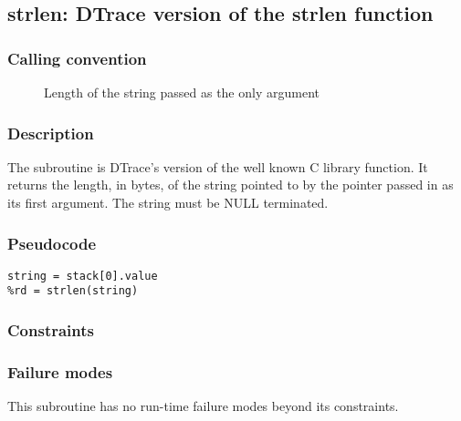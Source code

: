 \clearpage
{}
{}
\label{subr:strlen}
\subsection*{strlen: DTrace version of the strlen function}

\subsubsection*{Calling convention}

\begin{description}
\item[] Length of the string passed as the only argument
\end{description}

\subsubsection*{Description}

The  subroutine is DTrace's version of the well
known C library function.  It returns the length, in bytes, of the string
pointed to by the pointer passed in as its first argument. The string must be
NULL terminated.

\subsubsection*{Pseudocode}

\begin{verbatim}
string = stack[0].value
%rd = strlen(string)
\end{verbatim}

\subsubsection*{Constraints}

\subsubsection*{Failure modes}

This subroutine has no run-time failure modes beyond its constraints.
